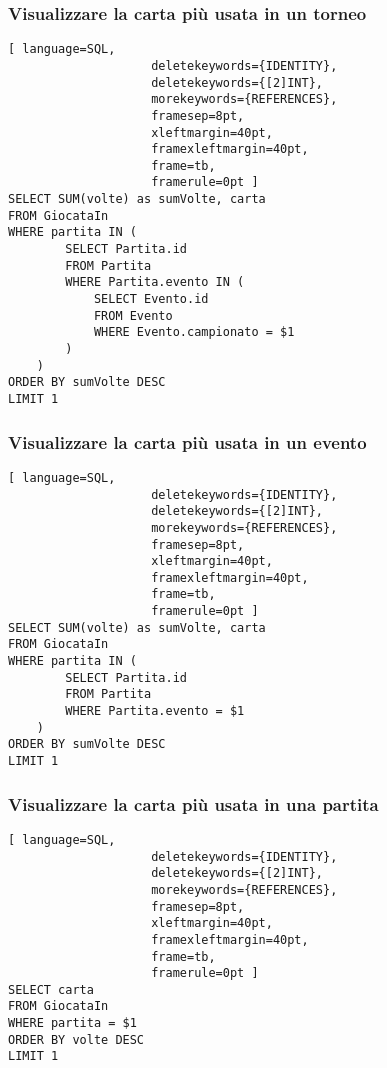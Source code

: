 \documentclass{article}
\begin{document}
\subsubsection{Visualizzare la carta più usata in un torneo}
\begin{lstlisting}[ language=SQL,
                    deletekeywords={IDENTITY},
                    deletekeywords={[2]INT},
                    morekeywords={REFERENCES},
                    framesep=8pt,
                    xleftmargin=40pt,
                    framexleftmargin=40pt,
                    frame=tb,
                    framerule=0pt ]
SELECT SUM(volte) as sumVolte, carta
FROM GiocataIn
WHERE partita IN (
        SELECT Partita.id
        FROM Partita
        WHERE Partita.evento IN (
            SELECT Evento.id
            FROM Evento
            WHERE Evento.campionato = $1
        )
    )
ORDER BY sumVolte DESC
LIMIT 1
\end{lstlisting}

\subsubsection{Visualizzare la carta più usata in un evento}
\begin{lstlisting}[ language=SQL,
                    deletekeywords={IDENTITY},
                    deletekeywords={[2]INT},
                    morekeywords={REFERENCES},
                    framesep=8pt,
                    xleftmargin=40pt,
                    framexleftmargin=40pt,
                    frame=tb,
                    framerule=0pt ]
SELECT SUM(volte) as sumVolte, carta
FROM GiocataIn
WHERE partita IN (
        SELECT Partita.id
        FROM Partita
        WHERE Partita.evento = $1
    )
ORDER BY sumVolte DESC
LIMIT 1
\end{lstlisting}

\subsubsection{Visualizzare la carta più usata in una partita}
\begin{lstlisting}[ language=SQL,
                    deletekeywords={IDENTITY},
                    deletekeywords={[2]INT},
                    morekeywords={REFERENCES},
                    framesep=8pt,
                    xleftmargin=40pt,
                    framexleftmargin=40pt,
                    frame=tb,
                    framerule=0pt ]
SELECT carta
FROM GiocataIn
WHERE partita = $1
ORDER BY volte DESC
LIMIT 1
\end{lstlisting}
\end{document}
